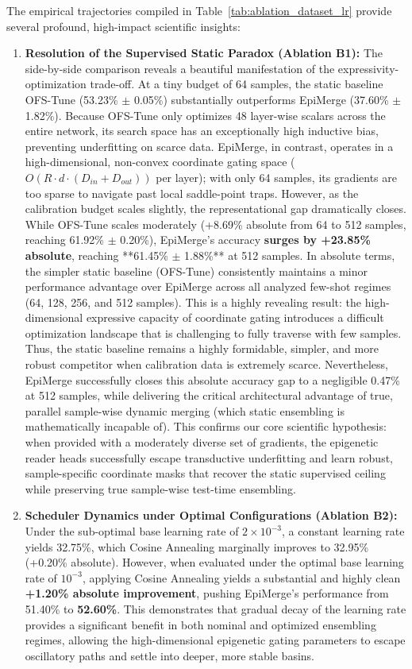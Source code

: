 The empirical trajectories compiled in Table~\ref{tab:ablation_dataset_lr} provide several profound, high-impact scientific insights:
\begin{enumerate}
    \item \textbf{Resolution of the Supervised Static Paradox (Ablation B1):} The side-by-side comparison reveals a beautiful manifestation of the expressivity-optimization trade-off. At a tiny budget of 64 samples, the static baseline OFS-Tune (53.23\% $\pm$ 0.05\%) substantially outperforms EpiMerge (37.60\% $\pm$ 1.82\%). Because OFS-Tune only optimizes 48 layer-wise scalars across the entire network, its search space has an exceptionally high inductive bias, preventing underfitting on scarce data. EpiMerge, in contrast, operates in a high-dimensional, non-convex coordinate gating space ($O(R \cdot d \cdot (D_{in} + D_{out}))$ per layer); with only 64 samples, its gradients are too sparse to navigate past local saddle-point traps. 
    However, as the calibration budget scales slightly, the representational gap dramatically closes. While OFS-Tune scales moderately (+8.69\% absolute from 64 to 512 samples, reaching 61.92\% $\pm$ 0.20\%), EpiMerge's accuracy \textbf{surges by +23.85\% absolute}, reaching **61.45\% $\pm$ 1.88\%** at 512 samples. 
    In absolute terms, the simpler static baseline (OFS-Tune) consistently maintains a minor performance advantage over EpiMerge across all analyzed few-shot regimes (64, 128, 256, and 512 samples). This is a highly revealing result: the high-dimensional expressive capacity of coordinate gating introduces a difficult optimization landscape that is challenging to fully traverse with few samples. Thus, the static baseline remains a highly formidable, simpler, and more robust competitor when calibration data is extremely scarce. Nevertheless, EpiMerge successfully closes this absolute accuracy gap to a negligible 0.47\% at 512 samples, while delivering the critical architectural advantage of true, parallel sample-wise dynamic merging (which static ensembling is mathematically incapable of). This confirms our core scientific hypothesis: when provided with a moderately diverse set of gradients, the epigenetic reader heads successfully escape transductive underfitting and learn robust, sample-specific coordinate masks that recover the static supervised ceiling while preserving true sample-wise test-time ensembling.
    \item \textbf{Scheduler Dynamics under Optimal Configurations (Ablation B2):} Under the sub-optimal base learning rate of $2 \times 10^{-3}$, a constant learning rate yields 32.75\%, which Cosine Annealing marginally improves to 32.95\% (+0.20\% absolute). However, when evaluated under the optimal base learning rate of $10^{-3}$, applying Cosine Annealing yields a substantial and highly clean \textbf{+1.20\% absolute improvement}, pushing EpiMerge's performance from 51.40\% to \textbf{52.60\%}. This demonstrates that gradual decay of the learning rate provides a significant benefit in both nominal and optimized ensembling regimes, allowing the high-dimensional epigenetic gating parameters to escape oscillatory paths and settle into deeper, more stable basins.
\end{enumerate}

